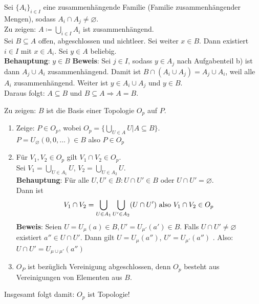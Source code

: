 \begin{problem*}[1c]
Sei $ \{ A_i \}_{i \in I}$ eine zusammenhängende Familie (Familie zusammenhängender Mengen), sodass 
$ A_i \cap A_j \neq \varnothing$.\\ 
Zu zeigen: $A \coloneqq \bigcup_{ i \in I } A_i$ ist zusammenhängend.\\
Sei $B \subseteq A$ offen, abgeschlossen und nichtleer. Sei weiter $x \in B$. Dann existiert $i \in I$ mit
$x \in A_i$. Sei $y \in A$ beliebig.\\
\textbf{Behauptung}: $y \in B$
\textbf{Beweis}: Sei $ j \in I$, sodass $ y \in A_j$ nach Aufgabenteil b) ist dann $ A_j \cup A_i $ zusammenhängend. Damit ist $ B \cap (A_i \cup A_j) = A_j \cup A_i $, weil alle $ A_i $ zusammenhängend.
Weiter ist $y \in A_i \cup A_j$ und $ y \in B $.\\
Daraus folgt: $A \subseteq B $ und $ B \subseteq A \Rightarrow A = B$.
\end{problem*}

\begin{problem*}[2a]
Zu zeigen: $B$ ist die Basis einer Topologie $O_p$ auf $ P$.
\begin{enumerate}
  \item Zeige: $P \in O_p$, wobei $O_p = \{ \bigcup_{U \in A } U | A \subseteq B \}$. \\
  $P = U_{ \varnothing } (0,0, \dots) \in B$ also $P \in O_p$
  \item Für $V_1,V_2 \in O_p$ gilt $ V_1 \cap V_2 \in O_p$.\\
  Sei $V_1 = \bigcup_{ U \in A_1} U $, $V_2 = \bigcup_{ U \in A_2} U $.\\
  \textbf{Behauptung}: Für alle $U,U' \in B: U \cap U' \in B$ oder $U \cap U' = \varnothing$.\\
  Dann ist 
  \begin{equation*}
    V_1 \cap V_2 = \bigcup_{ U \in A_1 }\bigcup_{ U' \in A_2 } (U \cap U')$ also $ V_1 \cap V_2 \in O_p\\
  \end{equation*}
  \textbf{Beweis}: Seien $U = U_{ \mu } (a) \in B , U' = U_{ \mu' } (a') \in B $. Falls $U \cap U' \neq \varnothing$ existiert $a'' \in U \cap U'$. Dann gilt $U = U_{ \mu }(a'')$, $U' = U_{ \mu' }(a'')$ . Also:\\
  $U \cap U' = U_{ \mu \cup \mu' } (a'')$
  \item $ O_P $ ist bezüglich Vereinigung abgeschlossen, denn $ O_p $ besteht aus Vereinigungen von Elementen aus $ B $. \\
\end{enumerate}
Insgesamt folgt damit: $ O_p $ ist Topologie!  
\end{problem*}

